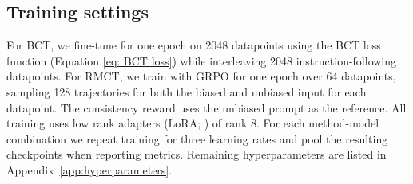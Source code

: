 \documentclass{article}
\newcommand{\todo}[1]{\textcolor{red}{\textbf{[TODO: #1]}}}
\newcommand{\suggestion}[1]{\textcolor{blue}{\textbf{[SUGGESTION: #1]}}}
\begin{document}
\subsection{Training settings}
For BCT, we fine-tune for one epoch on 2048 datapoints using the BCT loss function (Equation \ref{eq: BCT loss}) while interleaving 2048 instruction-following datapoints. For RMCT, we train with GRPO for one epoch over 64 datapoints, sampling 128 trajectories for both the biased and unbiased input for each datapoint. The consistency reward uses the unbiased prompt as the reference.
All training uses low rank adapters (LoRA; \citet{hu2022lora}) of rank 8. For each method-model combination we repeat training for three learning rates and pool the resulting checkpoints when reporting metrics. Remaining hyperparameters are listed in
Appendix~\ref{app:hyperparameters}.
\end{document}
